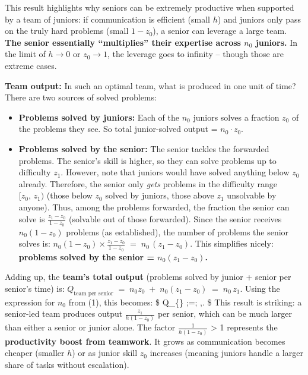 \documentclass[12pt]{article}
\begin{document}
This result highlights why seniors can be extremely productive when
supported by a team of juniors: if communication is efficient (small
\(h\)) and juniors only pass on the truly hard problems (small
\(1-z_0\)), a senior can leverage a large team. \textbf{The senior
essentially ``multiplies'' their expertise across \(n_0\) juniors.} In
the limit of \(h \to 0\) or \(z_0 \to 1\), the leverage goes to infinity
-- though those are extreme cases.

\textbf{Team output:} In such an optimal team, what is produced in one
unit of time? There are two sources of solved problems:

\begin{itemize}
\tightlist
\item
  \textbf{Problems solved by juniors:} Each of the \(n_0\) juniors
  solves a fraction \(z_0\) of the problems they see. So total
  junior-solved output = \(n_0 \cdot z_0\).
\item
  \textbf{Problems solved by the senior:} The senior tackles the
  forwarded problems. The senior's skill is higher, so they can solve
  problems up to difficulty \(z_1\). However, note that juniors would
  have solved anything below \(z_0\) already. Therefore, the senior only
  \emph{gets} problems in the difficulty range \([z_0,\, z_1)\) (those
  below \(z_0\) solved by juniors, those above
  $z_1$ unsolvable by anyone). Thus, among the problems forwarded, the fraction the senior can solve is \(\frac{z_1 - z_0}{\,1 - z_0\,}\)
  (solvable out of those forwarded). Since the senior receives
  \(n_0(1-z_0)\) problems (as established), the number of problems the
  senior solves is:
  \(n_0 (1-z_0) \times \frac{z_1 - z_0}{\,1 - z_0\,} \;=\; n_0\,(z_1 - z_0).\)
  This simplifies nicely: \textbf{problems solved by the senior =
  \(n_0 (z_1 - z_0)\).}
\end{itemize}

Adding up, the \textbf{team's total output} (problems solved by junior +
senior per senior's time) is:
\(Q_{\text{team per senior}} \;=\; n_0 z_0 \;+\; n_0 (z_1 - z_0) \;=\; n_0\, z_1.\)
Using the expression for \(n_0\) from (1), this becomes: \$
Q\_\{\} ;=; ,. \$
This result is striking: a senior-led team produces output
\(\frac{z_1}{h(1-z_0)}\) per senior, which can be much larger than
either a senior or junior alone. The factor \(\frac{1}{h(1-z_0)}\)
\textgreater{} 1 represents the \textbf{productivity boost from
teamwork}. It grows as communication becomes cheaper (smaller \(h\)) or
as junior skill \(z_0\) increases (meaning juniors handle a larger share
of tasks without escalation).
\end{document}
